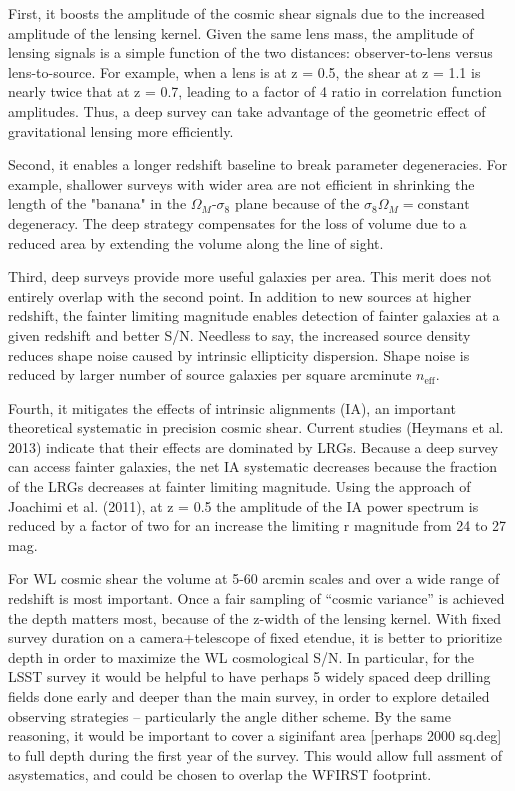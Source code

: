 First, it boosts the amplitude of the cosmic shear signals due to the increased
amplitude of the lensing kernel.  Given the same lens mass, the amplitude of
lensing signals is a simple function of the two distances: observer-to-lens
versus lens-to-source. For example, when a lens is at z = 0.5, the shear at z =
1.1 is nearly twice that at z = 0.7, leading to a factor of 4 ratio in
correlation function amplitudes.  Thus, a deep survey can take advantage of the
geometric effect of gravitational lensing more efficiently.

Second, it enables a longer redshift baseline to break parameter degeneracies.
For example, shallower surveys with wider area are not efficient in shrinking
the length of the "banana" in the $\Omega_M$-$\sigma_8$ plane because of the $\sigma_8 \Omega_M = \mathrm{constant}$ 
degeneracy.  The deep strategy compensates for the loss of
volume due to a reduced area by extending the volume along the line of sight.

Third, deep surveys provide more useful galaxies per area.  This merit does not
entirely overlap with the second point.  In addition to new sources at higher
redshift, the fainter limiting magnitude enables detection of fainter galaxies
at a given redshift and better S/N.  Needless to say, the increased source
density reduces shape noise caused by intrinsic ellipticity dispersion.  Shape
noise is reduced by larger number of source galaxies per square arcminute 
$n_\mathrm{eff}$.

Fourth, it mitigates the effects of intrinsic alignments (IA), an important 
theoretical systematic in precision cosmic
shear.  Current studies (Heymans et al. 2013) indicate that their effects are
dominated by LRGs.  Because a deep survey can access fainter galaxies, the net IA
systematic decreases because the fraction of the LRGs decreases at fainter
limiting magnitude. Using the approach of Joachimi et al. (2011),  at z = 0.5
the amplitude of the IA power spectrum is reduced by a factor of two for an
increase the limiting r magnitude from 24 to 27 mag.

For WL cosmic shear the volume at 5-60 arcmin scales and over a wide range of
redshift is most important. Once a fair sampling of “cosmic variance” is
achieved the depth matters most, because of the z-width of the lensing kernel.
With fixed survey duration on a camera+telescope of fixed etendue, it is better
to prioritize depth in order to maximize the WL cosmological S/N.  In
particular, for the LSST survey it would be helpful to have perhaps 5 widely
spaced deep drilling fields done early and deeper than the main survey, in order
to explore detailed observing strategies -- particularly the angle dither
scheme.  By the same reasoning, it would be important to cover  a siginifant
area [perhaps 2000 sq.deg] to full depth during the first year of the survey.
This would allow full assment of asystematics, and could be chosen to overlap
the WFIRST footprint.



